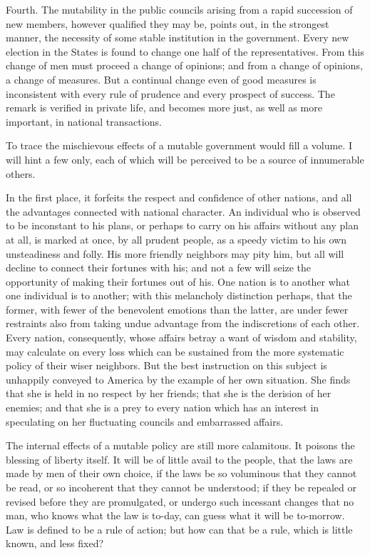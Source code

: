 Fourth. 
The mutability in the public councils arising from a rapid succession of new members, however qualified they may be, points out, in the strongest manner, the necessity of some stable institution in the government. 
Every new election in the States is found to change one half of the representatives. 
From this change of men must proceed a change of opinions; and from a change of opinions, a change of measures. 
But a continual change even of good measures is inconsistent with every rule of prudence and every prospect of success. 
The remark is verified in private life, and becomes more just, as well as more important, in national transactions.

To trace the mischievous effects of a mutable government would fill a volume. 
I will hint a few only, each of which will be perceived to be a source of innumerable others.

In the first place, it forfeits the respect and confidence of other nations, and all the advantages connected with national character. 
An individual who is observed to be inconstant to his plans, or perhaps to carry on his affairs without any plan at all, is marked at once, by all prudent people, as a speedy victim to his own unsteadiness and folly. 
His more friendly neighbors may pity him, but all will decline to connect their fortunes with his; and not a few will seize the opportunity of making their fortunes out of his. 
One nation is to another what one individual is to another; with this melancholy distinction perhaps, that the former, with fewer of the benevolent emotions than the latter, are under fewer restraints also from taking undue advantage from the indiscretions of each other. 
Every nation, consequently, whose affairs betray a want of wisdom and stability, may calculate on every loss which can be sustained from the more systematic policy of their wiser neighbors. 
But the best instruction on this subject is unhappily conveyed to America by the example of her own situation. 
She finds that she is held in no respect by her friends; that she is the derision of her enemies; and that she is a prey to every nation which has an interest in speculating on her fluctuating councils and embarrassed affairs.

The internal effects of a mutable policy are still more calamitous. 
It poisons the blessing of liberty itself. 
It will be of little avail to the people, that the laws are made by men of their own choice, if the laws be so voluminous that they cannot be read, or so incoherent that they cannot be understood; if they be repealed or revised before they are promulgated, or undergo such incessant changes that no man, who knows what the law is to-day, can guess what it will be to-morrow. 
Law is defined to be a rule of action; but how can that be a rule, which is little known, and less fixed?

